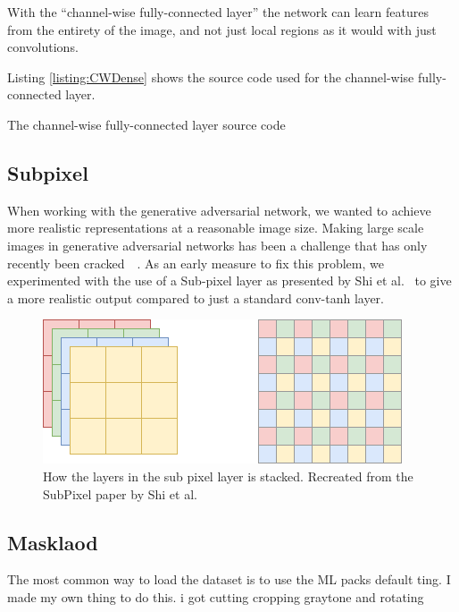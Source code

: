 With the ``channel-wise fully-connected layer'' the network can learn features from the entirety of the image, and not just local regions as it would with just convolutions. 

Listing \ref{listing:CWDense} shows the source code used for the channel-wise fully-connected layer.

\begin{minipage}{\linewidth}
\begin{listing}

\caption{The channel-wise fully-connected layer source code}
\label{listing:CWDense}
\end{listing}
\end{minipage}

\subsection{Subpixel}
When working with the generative adversarial network, we wanted to achieve more realistic representations at a reasonable image size. 
Making large scale images in generative adversarial networks has been a challenge that has only recently been cracked~\cite{DBLP:journals/corr/DentonCSF15}~\cite{DBLP:journals/corr/abs-1809-11096}.
As an early measure to fix this problem, we experimented with the use of a Sub-pixel layer as presented by Shi et al.~\cite{DBLP:journals/corr/ShiCHTABRW16} to give a more realistic output compared to just a standard conv-tanh layer.

\begin{figure}
\centering
\includegraphics[scale=0.8]{methodology/figures/SubPixel.png}
\caption{How the layers in the sub pixel layer is stacked. Recreated from the SubPixel paper by Shi et al.~\cite{DBLP:journals/corr/ShiCHTABRW16}}
\label{fig:SubPixel}
\end{figure}






\subsection{Masklaod}
The most common way to load the dataset is to use the ML packs default ting.
I made my own thing to do this. i got cutting cropping graytone and rotating


